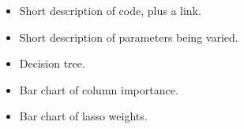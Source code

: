 \begin{itemize}
  \item Short description of code, plus a link.
  \item Short description of parameters being varied.
  \item Decision tree.
  \item Bar chart of column importance.
  \item Bar chart of lasso weights.
\end{itemize}
